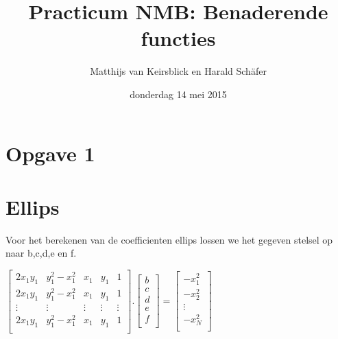 \documentclass[]{article}
\title{Practicum NMB: Benaderende functies}
\author{Matthijs van Keirsblick en Harald Sch\"{a}fer}
\date{donderdag 14 mei 2015}
\newcommand{\opgave}[1]{\pagebreak\section*{Opgave #1}}
\begin{document}
\maketitle
\opgave{1}
\section*{Ellips}
Voor het berekenen van de coefficienten ellips lossen we het gegeven stelsel op naar b,c,d,e en f.
\\

 \begin{center}
 $
 \begin{bmatrix}
  2x_{1}y_{1} & y_{1}^2-x_{1}^2 & x_{1} & y_{1} & 1 \\
   2x_{1}y_{1} & y_{1}^2-x_{1}^2 & x_{1} & y_{1} & 1 \\
  \vdots  & \vdots  & \vdots & \vdots & \vdots \\
   2x_{1}y_{1} & y_{1}^2-x_{1}^2 & x_{1} & y_{1} & 1 \\
 \end{bmatrix}
 .
  \begin{bmatrix}
  b\\
  c\\
  d\\
  e\\
  f\\
  \end{bmatrix}
  =
   \begin{bmatrix}
    -x^2_1\\
   -x^2_2\\
    \vdots\\
   -x^2_N\\
    \end{bmatrix}
    $
     \end{center}
\end{document}
